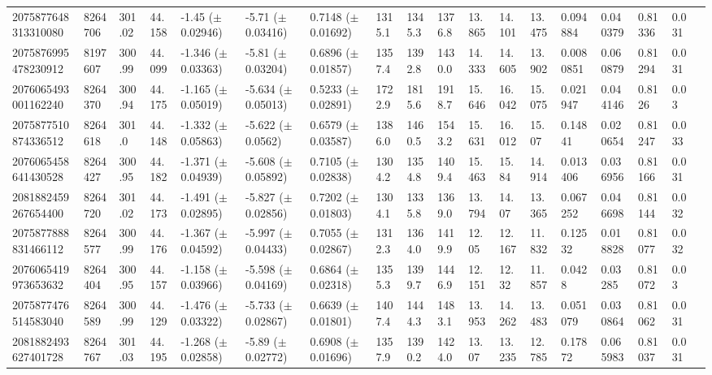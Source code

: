 \begin{sidewaystable}[htbp]
{\begin{tabular}{llllllllllllllllll}
        2075877648313310080 & 8264706 & 301.02 & 44.158 & -1.45 ($\pm$ 0.02946) & -5.71 ($\pm$ 0.03416) & 0.7148 ($\pm$ 0.01692) & 1315.1 & 1345.3 & 1376.8 & 13.865 & 14.101 & 13.475 & 0.094884 & 0.040379 & 0.81336 & 0.031 & \\
        2075876995478230912 & 8197607 & 300.99 & 44.099 & -1.346 ($\pm$ 0.03363) & -5.81 ($\pm$ 0.03204) & 0.6896 ($\pm$ 0.01857) & 1357.4 & 1392.8 & 1430.0 & 14.333 & 14.605 & 13.902 & 0.0080851 & 0.060879 & 0.81294 & 0.031 & \\
        2076065493001162240 & 8264370 & 300.94 & 44.175 & -1.165 ($\pm$ 0.05019) & -5.634 ($\pm$ 0.05013) & 0.5233 ($\pm$ 0.02891) & 1722.9 & 1815.6 & 1918.7 & 15.646 & 16.042 & 15.075 & 0.021947 & 0.044146 & 0.8126 & 0.03 & \\
        2075877510874336512 & 8264618 & 301.0 & 44.148 & -1.332 ($\pm$ 0.05863) & -5.622 ($\pm$ 0.0562) & 0.6579 ($\pm$ 0.03587) & 1386.0 & 1460.5 & 1543.2 & 15.631 & 16.012 & 15.07 & 0.14841 & 0.020654 & 0.81247 & 0.033 & \\
        2076065458641430528 & 8264427 & 300.95 & 44.182 & -1.371 ($\pm$ 0.04939) & -5.608 ($\pm$ 0.05892) & 0.7105 ($\pm$ 0.02838) & 1304.2 & 1354.8 & 1409.4 & 15.463 & 15.84 & 14.914 & 0.013406 & 0.036956 & 0.81166 & 0.031 & \\
        2081882459267654400 & 8264720 & 301.02 & 44.173 & -1.491 ($\pm$ 0.02895) & -5.827 ($\pm$ 0.02856) & 0.7202 ($\pm$ 0.01803) & 1304.1 & 1335.8 & 1369.0 & 13.794 & 14.07 & 13.365 & 0.067252 & 0.046698 & 0.81144 & 0.032 & \\
        2075877888831466112 & 8264577 & 300.99 & 44.176 & -1.367 ($\pm$ 0.04592) & -5.997 ($\pm$ 0.04433) & 0.7055 ($\pm$ 0.02867) & 1312.3 & 1364.0 & 1419.9 & 12.05 & 12.167 & 11.832 & 0.12532 & 0.018828 & 0.81077 & 0.032 & \\
        2076065419973653632 & 8264404 & 300.95 & 44.157 & -1.158 ($\pm$ 0.03966) & -5.598 ($\pm$ 0.04169) & 0.6864 ($\pm$ 0.02318) & 1355.3 & 1399.7 & 1446.9 & 12.151 & 12.32 & 11.857 & 0.0428 & 0.03285 & 0.81072 & 0.03 & \\
        2075877476514583040 & 8264589 & 300.99 & 44.129 & -1.476 ($\pm$ 0.03322) & -5.733 ($\pm$ 0.02867) & 0.6639 ($\pm$ 0.01801) & 1407.4 & 1444.3 & 1483.1 & 13.953 & 14.262 & 13.483 & 0.051079 & 0.030864 & 0.81062 & 0.031 & \\
        2081882493627401728 & 8264767 & 301.03 & 44.195 & -1.268 ($\pm$ 0.02858) & -5.89 ($\pm$ 0.02772) & 0.6908 ($\pm$ 0.01696) & 1357.9 & 1390.2 & 1424.0 & 13.07 & 13.235 & 12.785 & 0.17872 & 0.065983 & 0.81037 & 0.031 & \\

\end{tabular}}
\end{sidewaystable}
